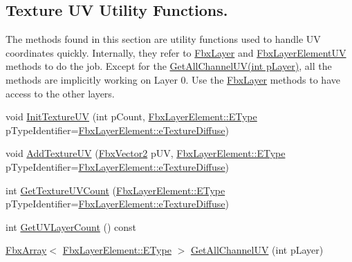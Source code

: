 \subsection*{Texture UV Utility Functions.}
\label{_amgrp0a785870c9dbfdfb55a4e6d5166ccdfc}%
The methods found in this section are utility functions used to handle UV coordinates quickly. Internally, they refer to {\ttfamily \hyperlink{class_fbx_layer}{Fbx\+Layer}} and {\ttfamily \hyperlink{class_fbx_layer_element_u_v}{Fbx\+Layer\+Element\+UV}} methods to do the job. Except for the \hyperlink{class_fbx_mesh_a85b62b9c7da656bec19a362d60160836}{Get\+All\+Channel\+U\+V(int p\+Layer)}, all the methods are implicitly working on Layer 0. Use the {\ttfamily \hyperlink{class_fbx_layer}{Fbx\+Layer}} methods to have access to the other layers. \begin{DoxyCompactItemize}
\item 
void \hyperlink{class_fbx_mesh_a40d57aa570c080f2f692728118b5bc04}{Init\+Texture\+UV} (int p\+Count, \hyperlink{class_fbx_layer_element_a8c95c5cd880b56c776acd379bd86f42c}{Fbx\+Layer\+Element\+::\+E\+Type} p\+Type\+Identifier=\hyperlink{class_fbx_layer_element_a8c95c5cd880b56c776acd379bd86f42ca09829e6ecf512e7ae04d9ad8de1342fa}{Fbx\+Layer\+Element\+::e\+Texture\+Diffuse})
\item 
void \hyperlink{class_fbx_mesh_a306f0e4f4a05de664327bb4389d0bfbf}{Add\+Texture\+UV} (\hyperlink{class_fbx_vector2}{Fbx\+Vector2} p\+UV, \hyperlink{class_fbx_layer_element_a8c95c5cd880b56c776acd379bd86f42c}{Fbx\+Layer\+Element\+::\+E\+Type} p\+Type\+Identifier=\hyperlink{class_fbx_layer_element_a8c95c5cd880b56c776acd379bd86f42ca09829e6ecf512e7ae04d9ad8de1342fa}{Fbx\+Layer\+Element\+::e\+Texture\+Diffuse})
\item 
int \hyperlink{class_fbx_mesh_a8a32eaf0ce16becd8e7de6c2783e61b9}{Get\+Texture\+U\+V\+Count} (\hyperlink{class_fbx_layer_element_a8c95c5cd880b56c776acd379bd86f42c}{Fbx\+Layer\+Element\+::\+E\+Type} p\+Type\+Identifier=\hyperlink{class_fbx_layer_element_a8c95c5cd880b56c776acd379bd86f42ca09829e6ecf512e7ae04d9ad8de1342fa}{Fbx\+Layer\+Element\+::e\+Texture\+Diffuse})
\item 
int \hyperlink{class_fbx_mesh_a1600702ceabd1ab9c36c91019318c6da}{Get\+U\+V\+Layer\+Count} () const
\item 
\hyperlink{class_fbx_array}{Fbx\+Array}$<$ \hyperlink{class_fbx_layer_element_a8c95c5cd880b56c776acd379bd86f42c}{Fbx\+Layer\+Element\+::\+E\+Type} $>$ \hyperlink{class_fbx_mesh_a85b62b9c7da656bec19a362d60160836}{Get\+All\+Channel\+UV} (int p\+Layer)
\end{DoxyCompactItemize}
